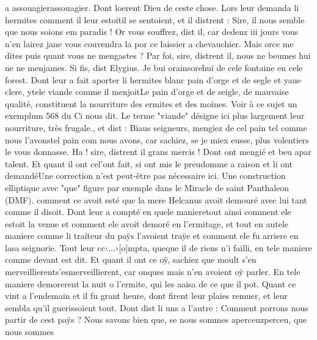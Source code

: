 \documentclass{article}
\begin{document}
\begin{pages}
                  a assouagierassouagier. Dont loerent Dieu de ceste chose. Lors leur demanda li hermites
               comment 
                     il leur estoitil se sentoient, et il distrent : Sire, il nous
                  semble que nous soions em paradis !
               Or vous souffrez, dist il, car dedenz iii
                  jours 
                     vous n’en lairez jane vous couvendra la por ce laissier a chevauchier. Mais 
                     orce me dites 
                        puis quant vous 
                        ne mengastes ?
               Par foi, sire, 
                     distrent il, nous ne beumes hui ne ne menjames.
               Si fis, dist Elygius. Je bui 
                     orainsorehui de cele fontaine en cele forest. Dont leur a fait aporter li hermites blanc pain d’orge et de segle et yaue
               clere, ytele viande comme il menjoitLe pain d'orge et de
                  seigle, de mauvaise qualité, constituent la nourriture des ermites et des moines.
                  Voir à ce sujet un exemplum 568 du Ci nous dit. Le terme
                  "viande" désigne ici plus largement leur nourriture, très frugale., et dist
               : Biaus seigneurs, mengiez de 
                     cel pain tel comme nous l’avonstel pain com nous avons, 
                     car sachiez, se 
                           je miex eusse, plus volentiers le vous donnasse.
               Ha ! sire, distrent il grans mercis ! Dont
               ont mengié et beu 
                  apar talent. Et quant il 
                  ont cel'ont fait, si ont mis le preudomme a raison 
                  et li ont demandéUne correction n'est peut-être pas nécessaire ici.
                  Une construction elliptique avec "que" figure par exemple dans le Miracle de saint Panthaleon (DMF).
               comment ce avoit esté que la mere Helcanus avoit
                  demouré avec lui tant comme il disoit. Dont leur a compté 
                     en quele manieretout ainsi comment
                  ele estoit la venue et comment ele avoit
                  demoré en l’ermitage, et tout en
                  autele maniere comme li traïteur du paÿs l’avoient traÿe et comment ele
                  fu arriere en 
                     lasa seignorie. Tout leur 
                  cc‹...›[o]mpta, 
                  queque il de riens n’i failli, 
                     en tele maniere comme devant est dit. Et quant il ont ce oÿ, sachiez que moult 
                  s’en merveillierents'esmerveillierent, car onques mais n’en avoient oÿ parler. En tele maniere demorerent la nuit o
                  l’ermite, qui les aaisa de ce que il pot. \pend
            \pstart Quant ce vint a l’endemain et il fu grant heure,
               dont firent leur plaies remuer, et leur sembla qu’il guerissoient 
                  tout. Dont dist li uns a l’autre : Comment porrons
                  nous partir de cest paÿs ? Nous savons bien que, se nous sommes 
                     aperceuzperceu, que nous sommes 
                     

\end{pages}
\end{document}
